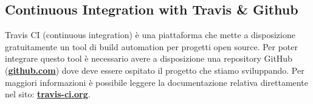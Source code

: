\subsection{Continuous Integration with Travis \& Github}
Travis CI (continuous integration) è una piattaforma che mette a disposizione gratuitamente un tool di build automation per progetti open source. Per poter integrare questo tool è necessario avere a disposizione una repository GitHub (\textbf{\href{https://github.com}{github.com}}) dove deve essere ospitato il progetto che stiamo sviluppando. Per maggiori informazioni è possibile leggere la documentazione relativa direttamente nel sito: \textbf{\href{https://travis-ci.org}{travis-ci.org}}.